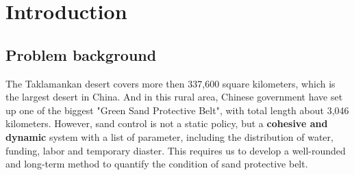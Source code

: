 \documentclass{mcmthesis}
\title{\PaperTitle}
\newcommand{\placeholder}[1]{\par\noindent\textit{[#1]}\par}
\begin{document}
\begin{abstract}
\placeholder{Write the problem overview, modeling methods, principal numerical
results, sensitivity findings, and recommendations here. Keep the complete
summary and keywords on this first page.}
\begin{keywords}
Keyword 1; Keyword 2; Keyword 3; Keyword 4
\end{keywords}
\end{abstract}
\hypersetup{pageanchor=false}
\maketitle
\hypersetup{pageanchor=true}

\pagestyle{main}
\tableofcontents
\clearpage

\section{Introduction}
\subsection{Problem background}
The Taklamankan desert covers more then 337,600 square kilometers, which is the largest desert in China. And in this rural area, Chinese government have set up one of the biggest "Green Sand Protective Belt", with total length about 3,046 kilometers.
However, sand control is not a static policy, but a \textbf{cohesive and dynamic} system with a list of parameter, including the distribution of water, funding, labor and temporary diaster.
This requires us to develop a well-rounded and long-term method to quantify the condition of sand protective belt.
\end{document}
